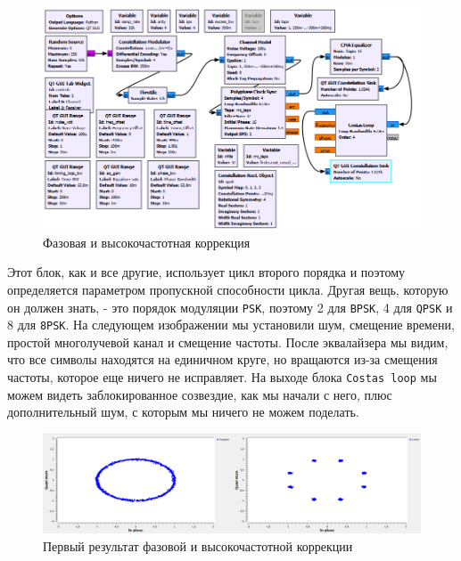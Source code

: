 \documentclass[a4paper]{article}
\begin{document}
            \begin{figure}[H]
                \centering
                \includegraphics[width=\textwidth]{ex_7_1.png}
                \caption{Фазовая и высокочастотная коррекция}
                \label{fig:ex_7_1}
            \end{figure}
            
            Этот блок, как и все другие, использует цикл второго порядка и поэтому определяется параметром пропускной способности цикла. Другая вещь, которую он должен знать, - это порядок модуляции \texttt{PSK}, поэтому 2 для \texttt{BPSK}, 4 для \texttt{QPSK} и 8 для \texttt{8PSK}. На следующем изображении мы установили шум, смещение времени, простой многолучевой канал и смещение частоты. После эквалайзера мы видим, что все символы находятся на единичном круге, но вращаются из-за смещения частоты, которое еще ничего не исправляет. На выходе блока \texttt{Costas loop} мы можем видеть заблокированное созвездие, как мы начали с него, плюс дополнительный шум, с которым мы ничего не можем поделать.
            
            \begin{figure}[H]
                \centering
                \includegraphics[width=\textwidth]{ex_7_2.png}
                \caption{Первый результат фазовой и высокочастотной коррекции}
                \label{fig:ex_7_2}
            \end{figure}
            
\end{document}
